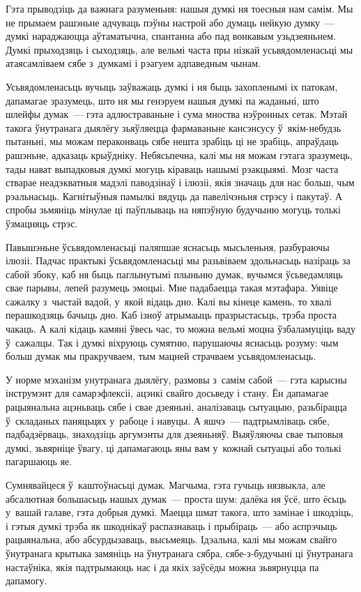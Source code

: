 Гэта прыводзіць да важнага разуменьня: нашыя думкі ня тоесныя нам самім. Мы не прымаем рашэньне адчуваць пэўны настрой або думаць нейкую думку~--- думкі нараджаюцца аўтаматычна, спантанна або пад вонкавым узьдзеяньнем. Думкі прыходзяць і сыходзяць, але вельмі часта пры нізкай усьвядомленасьці мы атаясамліваем сябе з~думкамі і рэагуем адпаведным чынам.

Усьвядомленасьць вучыць заўважаць думкі і ня быць захопленымі іх патокам, дапамагае зразумець, што ня мы генэруем нашыя думкі па жаданьні, што шлейфы думак~--- гэта адлюстраваньне і сума мноства нэўронных сетак. Мэтай такога ўнутранага дыялёгу зьяўляецца фармаваньне кансэнсусу ў~якім-небудзь пытаньні, мы можам пераконваць сябе нешта зрабіць ці не зрабіць, апраўдаць рашэньне, адказаць крыўдніку. Небясьпечна, калі мы ня можам гэтага зразумець, тады нават выпадковыя думкі могуць кіраваць нашымі рэакцыямі. Мозг часта стварае неадэкватныя мадэлі паводзінаў і ілюзіі, якія значаць для нас больш, чым рэальнасьць. Кагнітыўныя памылкі вядуць да павелічэньня стрэсу і пакутаў. А спробы зьмяніць мінулае ці паўплываць на няпэўную будучыню могуць толькі ўзмацняць стрэс.

Павышэньне ўсьвядомленасьці паляпшае яснасьць мысьленьня, разбураючы ілюзіі. Падчас практыкі ўсьвядомленасьці мы разьвіваем здольнасьць назіраць за сабой збоку, каб ня быць паглынутымі плыньню думак, вучымся ўсьведамляць свае парывы, лепей разумець эмоцыі. Мне падабаецца такая мэтафара. Уявіце сажалку з~чыстай вадой, у~якой відаць дно. Калі вы кінеце камень, то хвалі перашкодзяць бачыць дно. Каб ізноў атрымаыць празрыстасьць, трэба проста чакаць. А калі кідаць камяні ўвесь час, то можна вельмі моцна ўзбаламуціць ваду ў~сажалцы. Так і думкі віхруюць сумятню, парушаючы яснасьць розуму: чым больш думак мы пракручваем, тым мацней страчваем усьвядомленасьць.

У норме мэханізм унутранага дыялёгу, размовы з~самім сабой~--- гэта карысны інструмэнт для самарэфлексіі, ацэнкі свайго досьведу і стану. Ён дапамагае рацыянальна ацэньваць сябе і свае дзеяньні, аналізаваць сытуацыю, разьбірацца ў~складаных паняцьцях у~рабоце і навуцы. А яшчэ~--- падтрымліваць сябе, падбадзёрваць, знаходзіць аргумэнты для дзеяньняў. Выяўляючы свае тыповыя думкі, зьвярніце ўвагу, ці дапамагаюць яны вам у~кожнай сытуацыі або толькі пагаршаюць яе.

Сумнявайцеся ў~каштоўнасьці думак. Магчыма, гэта гучыць нязвыкла, але абсалютная большасьць нашых думак~--- проста шум: далёка ня ўсё, што ёсьць у~вашай галаве, гэта добрыя думкі. Маецца шмат такога, што замінае і шкодзіць, і гэтыя думкі трэба як шкоднікаў распазнаваць і прыбіраць~--- або аспрэчыць рацыянальна, або абсурдызаваць, высьмеяць. Ідэальна, калі мы можам свайго ўнутранага крытыка замяніць на ўнутранага сябра, сябе-з-будучыні ці ўнутранага настаўніка, якія падтрымаюць нас і да якіх заўсёды можна зьвярнуцца па дапамогу.

